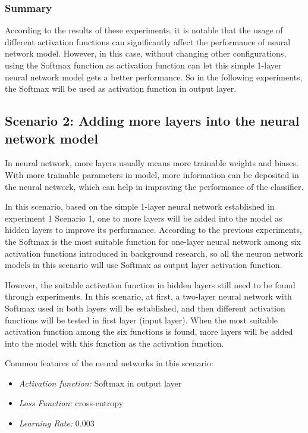 \documentclass[]{UCD_CS_FYP_Report}
\begin{document}
\subsubsection{Summary}
According to the results of these experiments, it is notable that the usage of different activation functions can significantly affect the performance of neural network model. However, in this case, without changing other configurations, using the Softmax function as activation function can let this simple 1-layer neural network model gets a better performance. So in the following experiments, the Softmax will be used as activation function in output layer.
\subsection{Scenario 2: Adding more layers into the neural network model}
In neural network, more layers usually means more trainable weights and biases. With more trainable parameters in model, more information can be deposited in the neural network, which can help in improving the performance of the classifier.

In this scenario, based on the simple 1-layer neural network established in experiment 1 Scenario 1, one to more layers will be added into the model as hidden layers to improve its performance. According to the previous experiments, the Softmax is the most suitable function for one-layer neural network among six activation functions introduced in background research, so all the neuron network models in this scenario will use Softmax as output layer activation function.

However, the suitable activation function in hidden layers still need to be found through experiments. In this scenario, at first, a two-layer neural network with Softmax used in both layers will be established, and then different activation functions will be tested in first layer (input layer). When the most suitable activation function among the six functions is found, more layers will be added into the model with this function as the activation function.

Common features of the neural networks in this scenario:
\begin{itemize}
\item {\sl Activation function:} Softmax in output layer
\item {\sl Loss Function:} cross-entropy
\item {\sl Learning Rate:} 0.003
\end{itemize} 
%
\end{document}
